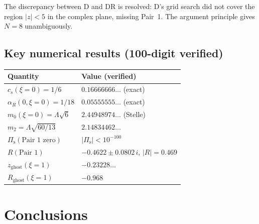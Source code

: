 \documentclass[11pt,a4paper]{article}
\newcommand{\Pis}{\Pi_{\mathrm{s}}}
\begin{document}
The discrepancy between D and DR is resolved: D's grid search did not
cover the region $|z| < 5$ in the complex plane, missing Pair~1.
The argument principle gives $N = 8$ unambiguously.

\subsection{Key numerical results (100-digit verified)}

\begin{center}
\begin{tabular}{l l}
\toprule
Quantity & Value (verified) \\
\midrule
$c_s(\xi=0) = 1/6$ & $0.16666666\ldots$ (exact) \\
$\alpha_R(0,\xi=0) = 1/18$ & $0.05555555\ldots$ (exact) \\
$m_0(\xi=0) = \Lambda\sqrt{6}$ & $2.44948974\ldots$ (Stelle) \\
$m_2 = \Lambda\sqrt{60/13}$ & $2.14834462\ldots$ \\
$\Pis(\text{Pair 1 zero})$ & $|{\Pis}| < 10^{-100}$ \\
$R(\text{Pair 1})$ & $-0.4622 \pm 0.0802\,i$, $|R| = 0.469$ \\
$z_{\text{ghost}}(\xi=1)$ & $-0.23228\ldots$ \\
$R_{\text{ghost}}(\xi=1)$ & $-0.968$ \\
\bottomrule
\end{tabular}
\end{center}

\section{Conclusions}
\label{sec:conclusions}
\end{document}
